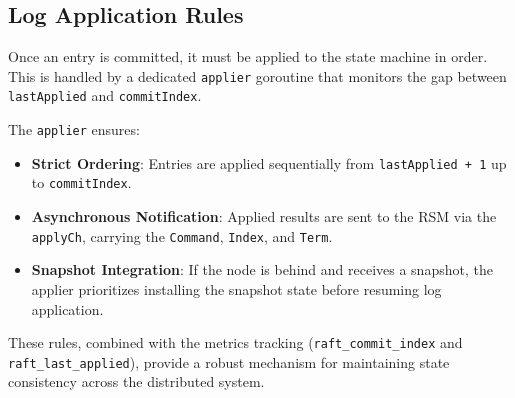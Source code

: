 \subsection{Log Application Rules}
Once an entry is committed, it must be applied to the state machine in order. This is handled by a dedicated \texttt{applier} goroutine that monitors the gap between \texttt{lastApplied} and \texttt{commitIndex}.

The \texttt{applier} ensures:
\begin{itemize}
    \item \textbf{Strict Ordering}: Entries are applied sequentially from \texttt{lastApplied + 1} up to \texttt{commitIndex}.
    \item \textbf{Asynchronous Notification}: Applied results are sent to the RSM via the \texttt{applyCh}, carrying the \texttt{Command}, \texttt{Index}, and \texttt{Term}.
    \item \textbf{Snapshot Integration}: If the node is behind and receives a snapshot, the applier prioritizes installing the snapshot state before resuming log application.
\end{itemize}

These rules, combined with the metrics tracking (\texttt{raft\_commit\_index} and \texttt{raft\_last\_applied}), provide a robust mechanism for maintaining state consistency across the distributed system.